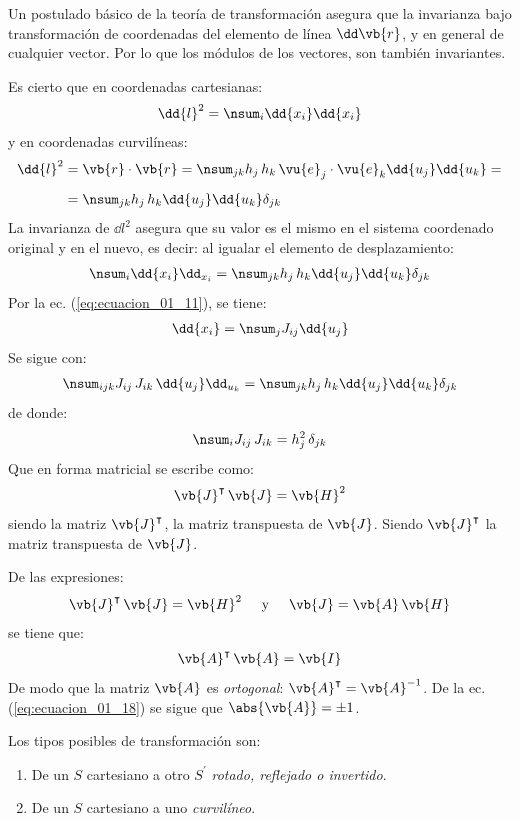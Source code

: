Un postulado básico de la teoría de transformación asegura que la invarianza bajo transformación de coordenadas del elemento de línea $\dd\vb{r}$, y en general de cualquier vector. Por lo que los módulos de los vectores, son también invariantes.
\par
Es cierto que en coordenadas cartesianas:
\begin{align*}
\dd{l}^{2} = \nsum_{i} \dd{x_{i}} \dd{x_{i}}
\end{align*}
y en coordenadas curvilíneas:
\begin{align*}
\dd{l}^{2} &= \vb{r} \cdot \vb{r} = \nsum_{jk} h_{j} \, h_{k} \, \vu{e}_{j} \cdot \vu{e}_{k} \dd{u_{j}} \dd{u_{k}} = \\[0.5em]
&= \nsum_{jk} h_{j} \, h_{k} \dd{u_{j}} \dd{u_{k}} \delta_{jk}
\end{align*}
La invarianza de $\dd{l}^{2}$ asegura que su valor es el mismo en el sistema coordenado original y en el nuevo, es decir: al igualar el elemento de desplazamiento:
\begin{align*}
\nsum_{i} \dd{x_{i}} \dd_{x_{i}} = \nsum_{jk} h_{j} \, h_{k} \dd{u_{j}} \dd{u_{k}} \delta_{jk}
\end{align*}
Por la ec. (\ref{eq:ecuacion_01_11}), se tiene:
\begin{align*}
\dd{x_{i}} = \nsum_{j} J_{ij} \dd{u_{j}}
\end{align*}
Se sigue con:
\begin{align*}
\nsum_{ijk} J_{ij} \, J_{ik} \, \dd{u_{j}} \dd_{u_{k}} = \nsum_{jk} h_{j} \, h_{k} \dd{u_{j}} \dd{u_{k}} \delta_{jk}
\end{align*}
de donde:
\begin{align*}
\nsum_{i} J_{ij} \, J_{ik} = h_{j}^{2} \, \delta_{jk}
\end{align*}
Que en forma matricial se escribe como:
\begin{align*}
\vb{J}^{\intercal} \, \vb{J} = \vb{H}^{2}
\end{align*}
siendo la matriz $\vb{J}^{\intercal}$, la matriz transpuesta de $\vb{J}$. Siendo $\vb{J}^{\intercal}$ la matriz transpuesta de $\vb{J}$.
\par
De las expresiones:
\begin{align*}
\vb{J}^{\intercal} \, \vb{J} = \vb{H}^{2} \hspace{0.5cm} \mbox{y} \hspace{0.5cm} \vb{J} = \vb{A} \, \vb{H}
\end{align*}
se tiene que:
\begin{align}
\vb{A}^{\intercal} \, \vb{A} = \vb{I}
\label{eq:ecuacion_01_18}
\end{align}
De modo que la matriz $\vb{A}$ es \emph{ortogonal}: $\vb{A}^{\intercal} = \vb{A}^{-1}$.
De la ec. (\ref{eq:ecuacion_01_18}) se sigue que $\abs{\vb{A}} = \pm 1$.
\par
Los tipos posibles de transformación son:
\begin{enumerate}
\item De un $S$ cartesiano a otro $S^{\prime}$ \emph{rotado, reflejado o invertido}.
\item De un $S$ cartesiano a uno \emph{curvilíneo}.
\end{enumerate}

